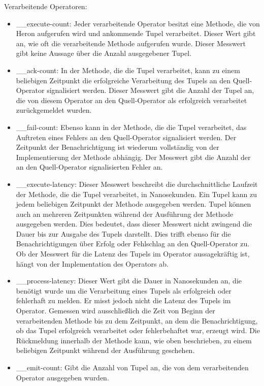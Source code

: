 Verarbeitende Operatoren:

\begin{itemize}
\item{\_\_execute-count: Jeder verarbeitende Operator besitzt eine Methode, die von Heron aufgerufen wird und ankommende Tupel verarbeitet. Dieser Wert gibt an, wie oft die verarbeitende Methode aufgerufen wurde. Dieser Messwert gibt keine Aussage über die Anzahl ausgegebener Tupel.}

\item{\_\_ack-count: In der Methode, die die Tupel verarbeitet, kann zu einem beliebigen Zeitpunkt die erfolgreiche Verarbeitung des Tupels an den Quell-Operator signalisiert werden. Dieser Messwert gibt die Anzahl der Tupel an, die von diesem Operator an den Quell-Operator als erfolgreich verarbeitet zurückgemeldet wurden.}

\item{\_\_fail-count: Ebenso kann in der Methode, die die Tupel verarbeitet, das Auftreten eines Fehlers an den Quell-Operator signalisiert werden. Der Zeitpunkt der Benachrichtigung ist wiederum vollständig von der Implementierung der Methode abhängig. Der Messwert gibt die Anzahl der an den Quell-Operator signalisierten Fehler an.}

\item{\_\_execute-latency: Dieser Messwert beschreibt die durchschnittliche Laufzeit der Methode, die die Tupel verarbeitet, in Nanosekunden. Ein Tupel kann zu jedem beliebigen Zeitpunkt der Methode ausgegeben werden. Tupel können auch an mehreren Zeitpunkten während der Ausführung der Methode ausgegeben werden. Dies bedeutet, dass dieser Messwert nicht zwingend die Dauer bis zur Ausgabe des Tupels darstellt. Dies trifft ebenso für die Benachrichtigungen über Erfolg oder Fehlschlag an den Quell-Operator zu. Ob der Messwert für die Latenz des Tupels im Operator aussagekräftig ist, hängt von der Implementation des Operators ab.}

\item{\_\_process-latency: Dieser Wert gibt die Dauer in Nanosekunden an, die benötigt wurde um die Verarbeitung eines Tupels als erfolgreich oder fehlerhaft zu melden. Er misst jedoch nicht die Latenz des Tupels im Operator. Gemessen wird ausschließlich die Zeit von Beginn der verarbeitenden Methode bis zu dem Zeitpunkt, an dem die Benachrichtigung, ob das Tupel erfolgreich verarbeitet oder fehlerbehaftet war, erzeugt wird. Die Rückmeldung innerhalb der Methode kann, wie oben beschrieben, zu einem beliebigen Zeitpunkt während der Ausführung geschehen.}

\item{\_\_emit-count: Gibt die Anzahl von Tupel an, die von dem verarbeitenden Operator ausgegeben wurden.}

\end{itemize}

